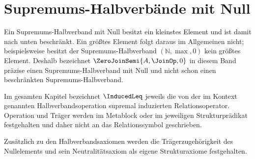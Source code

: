 \documentclass[main.tex]{subfiles}
\begin{document}
\section{Supremums-Halbverbände mit Null}

Ein Supremums-Halbverband mit Null besitzt ein kleinstes Element und ist
damit nach unten beschränkt. Ein größtes Element folgt daraus im Allgemeinen
nicht; beispielsweise besitzt der Supremums-Halbverband
\((\mathbb{N},\max,0)\) kein größtes Element. Deshalb bezeichnet
\(\ZeroJoinSemi{A,\JoinOp,0}\) in diesem Band präzise einen
Supremums-Halbverband mit Null und nicht schon einen beschränkten
Supremums-Halbverband.

Im gesamten Kapitel bezeichnet \(\InducedLeq\) jeweils die von der im
Kontext genannten Halbverbandsoperation supremal induzierten Relationsoperator.
Operation und Träger werden im Metablock oder im jeweiligen
Strukturprädikat festgehalten und daher nicht an das Relationssymbol
geschrieben.

Zusätzlich zu den Halbverbandsaxiomen werden die Trägerzugehörigkeit des
Nullelements und sein Neutralitätsaxiom als eigene Strukturaxiome festgehalten.

\par\smallskip

\par\smallskip


\end{document}
